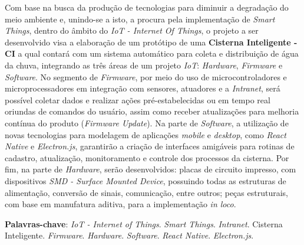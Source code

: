 
\begin{resumo}[RESUMO]
\begin{SingleSpacing}

 Com base na busca da produção de tecnologias para diminuir a degradação do meio ambiente e, unindo-se a isto, a procura pela implementação de \textit{Smart Things}, dentro do âmbito do \textit{IoT - Internet Of Things},  o projeto a ser desenvolvido visa a elaboração de um protótipo de uma \textbf{Cisterna Inteligente - CI} a qual contará com um sistema automático para coleta e distribuição de água da chuva, integrando as três áreas de um projeto \textit{IoT}: \textit{Hardware}, \textit{Firmware} e \textit{Software}. No segmento de \textit{Firmware}, por meio do uso de microcontroladores e microprocessadores em integração com sensores, atuadores e a \textit{Intranet}, será possível coletar dados e realizar ações pré-estabelecidas ou em tempo real oriundas de comandos do usuário, assim como receber atualizações para melhoria contínua do produto (\textit{Firmware Update}).  Na parte de \textit{Software}, a utilização de novas tecnologias para modelagem de aplicações \textit{mobile} e \textit{desktop}, como  \textit{React Native} e \textit{Electron.js},  garantirão a criação de interfaces amigáveis para rotinas de cadastro, atualização, monitoramento e controle dos processos da cisterna. Por fim, na parte de \textit{Hardware}, serão desenvolvidos: placas de circuito impresso, com dispositivos \textit{SMD - Surface Mounted Device}, possuindo todas as estruturas de alimentação, conversão de sinais, comunicação, entre outros; peças estruturais, com base em manufatura aditiva, para a implementação \textit{in loco}.
 
\vspace{\onelineskip}

\textbf{Palavras-chave}: \textit{IoT - Internet of Things}. \textit{Smart Things}. \textit{Intranet}.  Cisterna Inteligente. \textit{Firmware}. \textit{Hardware}. \textit{Software}. \textit{React Native}. \textit{Electron.js}.

\end{SingleSpacing}
\end{resumo}


